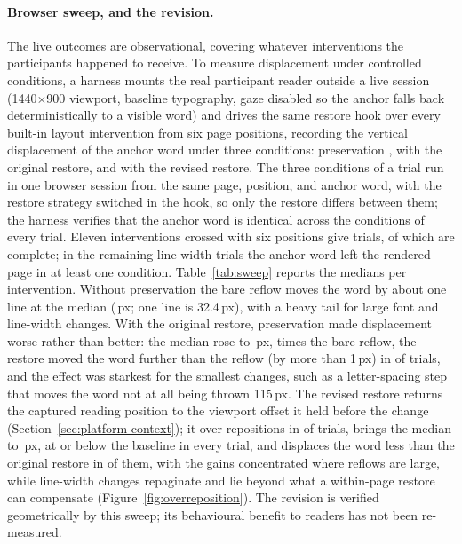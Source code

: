 \paragraph{Browser sweep, and the revision.}
The live outcomes are observational, covering whatever interventions the participants happened to receive.
To measure displacement under controlled conditions, a harness mounts the real participant reader outside a live session (1440$\times$900 viewport, baseline typography, gaze disabled so the anchor falls back deterministically to a visible word) and drives the same restore hook over every built-in layout intervention from six page positions, recording the vertical displacement of the anchor word under three conditions: preservation \off{}, \on{} with the original restore, and \on{} with the revised restore.
The three conditions of a trial run in one browser session from the same page, position, and anchor word, with the restore strategy switched in the hook, so only the restore differs between them; the harness verifies that the anchor word is identical across the conditions of every trial.
Eleven interventions crossed with six positions give \sweepTrials{} trials, of which \sweepPairs{} are complete; in the remaining line-width trials the anchor word left the rendered page in at least one condition.
Table~\ref{tab:sweep} reports the medians per intervention.
Without preservation the bare reflow moves the word by about one line at the median (\sweepOffMedian{}\,px; one line is 32.4\,px), with a heavy tail for large font and line-width changes.
With the original restore, preservation made displacement worse rather than better: the median rose to \sweepOnMedianOriginal{}\,px, \sweepRatioOriginal{} times the bare reflow, the restore moved the word further than the reflow (by more than 1\,px) in \sweepOverOriginal{} of \sweepPairs{} trials, and the effect was starkest for the smallest changes, such as a letter-spacing step that moves the word not at all being thrown 115\,px.
The revised restore returns the captured reading position to the viewport offset it held before the change (Section~\ref{sec:platform-context}); it over-repositions in \sweepOverRevised{} of \sweepPairs{} trials, brings the median to \sweepOnMedianRevised{}\,px, at or below the \off{} baseline in every trial, and displaces the word less than the original restore in \sweepRevisedBelowOriginal{} of them, with the gains concentrated where reflows are large, while line-width changes repaginate and lie beyond what a within-page restore can compensate (Figure~\ref{fig:overreposition}).
The revision is verified geometrically by this sweep; its behavioural benefit to readers has not been re-measured.

